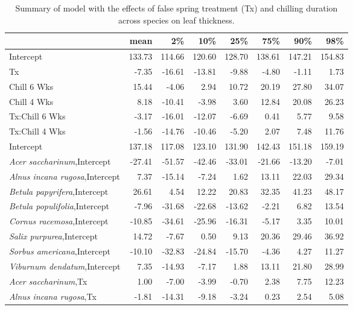 \documentclass{article}\usepackage[]{graphicx}\usepackage[]{color}
\begin{document}
\newpage
\begin{longtable}{lrrrrrrr}
\caption{Summary of model with the effects of false spring treatment (Tx) and chilling duration across species on leaf thickness.} \\ 
  \hline
 & mean & 2\% & 10\% & 25\% & 75\% & 90\% & 98\% \\ 
  \hline \endhead  \hline
Intercept & 133.73 & 114.66 & 120.60 & 128.70 & 138.61 & 147.21 & 154.83 \\ 
  Tx & -7.35 & -16.61 & -13.81 & -9.88 & -4.80 & -1.11 & 1.73 \\ 
  Chill 6 Wks & 15.44 & -4.06 & 2.94 & 10.72 & 20.19 & 27.80 & 34.07 \\ 
  Chill 4 Wks & 8.18 & -10.41 & -3.98 & 3.60 & 12.84 & 20.08 & 26.23 \\ 
  Tx:Chill 6 Wks & -3.17 & -16.01 & -12.07 & -6.69 & 0.41 & 5.77 & 9.58 \\ 
  Tx:Chill 4 Wks & -1.56 & -14.76 & -10.46 & -5.20 & 2.07 & 7.48 & 11.76 \\ 
  Intercept & 137.18 & 117.08 & 123.10 & 131.90 & 142.43 & 151.18 & 159.19 \\ 
  \textit{Acer saccharinum},Intercept & -27.41 & -51.57 & -42.46 & -33.01 & -21.66 & -13.20 & -7.01 \\ 
  \textit{Alnus incana rugosa},Intercept & 7.37 & -15.14 & -7.24 & 1.62 & 13.11 & 22.03 & 29.34 \\ 
  \textit{Betula papyrifera},Intercept & 26.61 & 4.54 & 12.22 & 20.83 & 32.35 & 41.23 & 48.17 \\ 
  \textit{Betula populifolia},Intercept & -7.96 & -31.68 & -22.68 & -13.62 & -2.21 & 6.82 & 13.54 \\ 
  \textit{Cornus racemosa},Intercept & -10.85 & -34.61 & -25.96 & -16.31 & -5.17 & 3.35 & 10.01 \\ 
  \textit{Salix purpurea},Intercept & 14.72 & -7.67 & 0.50 & 9.13 & 20.36 & 29.46 & 36.92 \\ 
  \textit{Sorbus americana},Intercept & -10.10 & -32.83 & -24.84 & -15.70 & -4.36 & 4.27 & 11.27 \\ 
  \textit{Viburnum dendatum},Intercept & 7.35 & -14.93 & -7.17 & 1.88 & 13.11 & 21.80 & 28.99 \\ 
  \textit{Acer saccharinum},Tx & 1.00 & -7.00 & -3.99 & -0.70 & 2.38 & 7.75 & 12.23 \\ 
  \textit{Alnus incana rugosa},Tx & -1.81 & -14.31 & -9.18 & -3.24 & 0.23 & 2.54 & 5.08 \\ 

\end{longtable}
\end{document}
